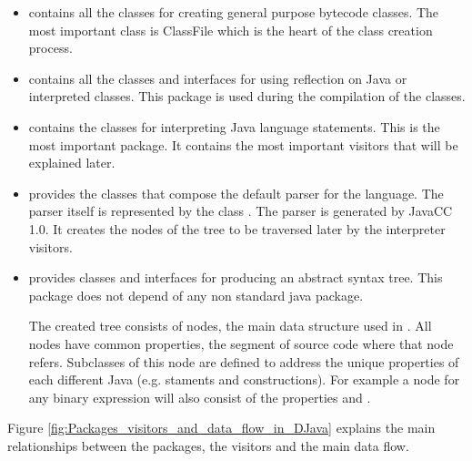 \begin{itemize}
\item {} contains all the classes for creating general purpose bytecode
classes. The most important class is ClassFile which is the heart
of the class creation process.

\item {} contains all the classes and interfaces for using reflection
on Java or interpreted classes. This package is used during
the compilation of the classes.

\item {} contains the classes for interpreting Java language statements.
This is the most important package. It contains the most important
visitors that will be explained later.

\item {} provides the classes that compose the default parser for the
language. The parser itself is represented by the class .
The parser is generated by JavaCC 1.0. It creates the nodes of the
tree to be traversed later by the interpreter visitors.

\item {} provides classes and interfaces for producing an abstract syntax
tree. This package does not depend of any non standard java package.

The created tree consists of nodes, the main data structure used
in \djava{}. All nodes have common properties, the segment
of source code where that node refers. Subclasses of this node
are defined to address the unique properties of each different
Java (e.g. staments and constructions). For example a node for
any binary expression will also consist of the properties 
and .

\end{itemize}

Figure \ref{fig:Packages_visitors_and_data_flow_in_DJava} explains the
main relationships between the packages, the visitors and the main data flow.

